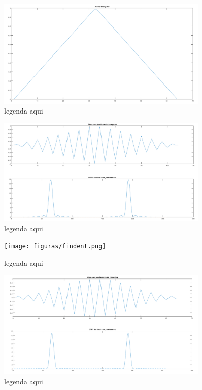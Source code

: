 \documentclass[a4paper, 12pt]{book}
\begin{document}
\begin{figure}[h]
    \centering
    \includegraphics[width=0.9\textwidth]{figuras/f4.png}
    \caption{legenda aqui}
    \label{fig:f4}
\end{figure}

\begin{figure}[h]
    \centering
    \includegraphics[width=0.9\textwidth]{figuras/f3.png}
    \caption{legenda aqui}
    \label{fig:f3}
\end{figure}

\begin{figure}[h]
    \centering
    \texttt{[image: figuras/findent.png]}
    \caption{legenda aqui}
    \label{fig:findent}
\end{figure}

\begin{figure}[h]
    \centering
    \includegraphics[width=0.9\textwidth]{figuras/f1.png}
    \caption{legenda aqui}
    \label{fig:f1}
\end{figure}
\end{document}
